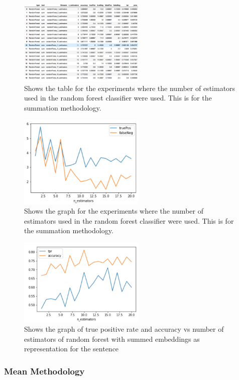 \documentclass[twoside,twocolumn]{article}
\begin{document}
\begin{figure}[H]
\includegraphics[width=6cm]{randForest_estimators_summed_table}
\centering
\caption{Shows the table for the experiments where the number of estimators used
in the random forest classifier were used. This is for the summation methodology.}
\end{figure}

\begin{figure}[H]
\includegraphics[width=6cm]{randForest_estimators_summed_graph}
\centering
\caption{Shows the graph for the experiments where the number of estimators used
in the random forest classifier were used. This is for the summation methodology.}
\end{figure}

\begin{figure}[H]
\includegraphics[width=6cm]{randForest_estimators_summed_graph-tpr}
\centering
\caption{Shows the graph of true positive rate and accuracy vs number of estimators of random forest 
with summed embeddings as representation for the sentence}
\end{figure}


\subsubsection{Mean Methodology}
\end{document}
